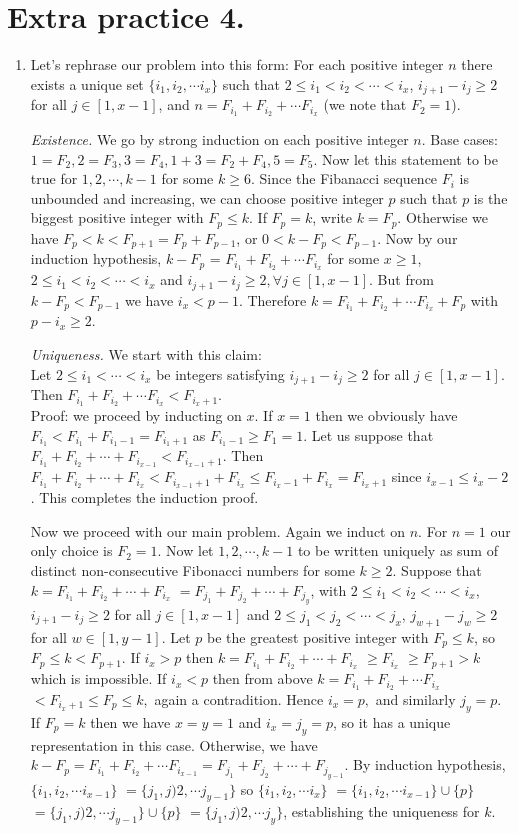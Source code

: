 \documentclass[11pt]{article}
\begin{document}
\section {Extra practice 4.}
\begin{enumerate}
\item 
Let's rephrase our problem into this form: For each positive integer $n$ there exists a unique set $\{i_1, i_2,\cdots i_x\}$ such that $2\le i_1<i_2<\cdots <i_x$, $i_{j+1}-i_j\ge 2$ for all $j\in [1, x-1]$, and $n= F_{i_1}+F_{i_2}+\cdots F_{i_x}$ (we note that $F_2=1$).

\emph {Existence.}
We go by strong induction on each positive integer $n$. Base cases: $1= F_2,2=F_3,3=F_4,1+3=F_2+F_4,5=F_5$. Now let this statement to be true for $1,2,\cdots , k-1$ for some $k\ge 6$. Since the Fibanacci sequence $F_i$ is unbounded and increasing, we can choose positive integer $p$ such that $p$ is the biggest positive integer with $F_p\le k.$ If $F_p=k$, write $k=F_p$. Otherwise we have $F_p<k<F_{p+1}=F_p+F_{p-1}$, or $0<k-F_{p}<F_{p-1}$. Now by our induction hypothesis, $k-F_{p}$ = $F_{i_1}+F_{i_2}+\cdots F_{i_x}$ for some $x\ge 1$, $2\le i_1<i_2<\cdots <i_x$ and $i_{j+1}-i_j\ge 2, \forall j\in [1,x-1]$. But from $k-F_p<F_{p-1}$ we have $i_x<p-1$. Therefore $k=F_{i_1}+F_{i_2}+\cdots F_{i_x}+F_p$ with $p-i_x\ge 2$.

\emph {Uniqueness.} We start with this claim:\\
Let $2\le i_1<\cdots <i_x$ be integers satisfying $i_{j+1}-i_j\ge 2$ for all $j\in [1,x-1].$ Then $F_{i_1}+F_{i_2}+\cdots F_{i_x}<F_{i_{x}+1}$.\\
Proof: we proceed by inducting on $x$. If $x=1$ then we obviously have $F_{i_1}<F_{i_1}+F_{i_1-1}=F_{i_1+1}$ as $F_{i_1-1}\ge F_1=1$. Let us suppose that $F_{i_1}+F_{i_2}+\cdots +F_{i_{x-1}}<F_{i_{x-1}+1}$. Then $F_{i_1}+F_{i_2}+\cdots + F_{i_x}<F_{i_{x-1}+1}+F_{i_x}\le F_{i_{x}-1}+F_{i_x}=F_{i_{x}+1}$ since $i_{x-1}\le i_x-2$. This completes the induction proof.

Now we proceed with our main problem. Again we induct on $n$. For $n=1$ our only choice is $F_2=1$. Now let $1,2,\cdots , k-1$ to be written uniquely as sum of distinct non-consecutive Fibonacci numbers for some $k\ge 2$. Suppose that 
$k=F_{i_1}+F_{i_2}+\cdots +F_{i_x}$
$=F_{j_1}+F_{j_2}+\cdots +F_{j_y}$,
with $2\le i_1<i_2<\cdots <i_x$, $i_{j+1}-i_j\ge 2$ for all $j\in [1, x-1]$ and $2\le j_1<j_2<\cdots <j_x$, $j_{w+1}-j_w\ge 2$ for all $w\in [1, y-1]$.
Let $p$ be the greatest positive integer with $F_p\le k$, so $F_p\le k<F_{p+1}$. If $i_x>p$ then 
$k=F_{i_1}+F_{i_2}+\cdots +F_{i_x}$
$\ge F_{i_x}$
$\ge F_{p+1}>k$ which is impossible. If $i_x<p$ then from above 
$k=F_{i_1}+F_{i_2}+\cdots F_{i_x}$
$<F_{i_{x}+1}\le F_p\le k,$ again a contradition. Hence $i_x=p,$ and similarly $j_y=p$. If $F_p=k$ then we have $x=y=1$ and $i_x=j_y=p$, so it has a unique representation in this case. Otherwise, we have $k-F_p=F_{i_1}+F_{i_2}+\cdots F_{i_{x-1}}=F_{j_1}+F_{j_2}+\cdots +F_{j_{y-1}}$. By induction hypothesis, 
$\{i_1, i_2,\cdots i_{x-1}\}$
$=\{j_1, j)2, \cdots j_{y-1}\}$ so 
$\{i_1, i_2,\cdots i_x\}$
$=\{i_1, i_2,\cdots i_{x-1}\}\cup \{p\}$
$=\{j_1, j)2, \cdots j_{y-1}\}\cup\{p\}$
$=\{j_1, j)2, \cdots j_y\}$, 
establishing the uniqueness for $k$.


\end{enumerate}
\end{document}
